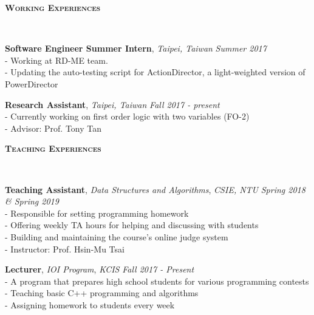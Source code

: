 \documentclass[10pt]{article}
\newenvironment{changemargin}[2]{%
  \begin{list}{}{%
    \setlength{\topsep}{0pt}%
    \setlength{\leftmargin}{#1}%
    \setlength{\rightmargin}{#2}%
    \setlength{\listparindent}{\parindent}%
    \setlength{\itemindent}{\parindent}%
    \setlength{\parsep}{\parskip}%
  }%
  \item[]}{\end{list}
}
\newcommand{\lineover}{
	\begin{changemargin}{-0.05in}{-0.05in}
		\vspace*{-8pt}
		\hrulefill \\
		\vspace*{-2pt}
	\end{changemargin}
}
\newcommand{\header}[1]{
	\begin{changemargin}{-0.5in}{-0.5in}
		\large{\bf \scshape{#1}}\\
  	\lineover
	\end{changemargin}
}
\newenvironment{body} {
	\vspace*{-16pt}
	\begin{changemargin}{-0.25in}{-0.5in}
  }	
	{\end{changemargin}
}
\begin{document}
\smallskip

\header{Working Experiences}

\begin{body}
	\vspace{14pt}

	\textbf {Software Engineer Summer Intern}, \emph{Taipei, Taiwan} \hfill \emph{Summer 2017}\\
	\hspace{12pt} - Working at RD-ME team.\\
	\hspace{12pt} - Updating the auto-testing script for ActionDirector, a light-weighted version of PowerDirector
	\smallskip
	
	\textbf {Research Assistant}, \emph{Taipei, Taiwan} \hfill \emph{Fall 2017 - present}\\
	\hspace{12pt} - Currently working on first order logic with two variables (FO-2)\\
	\hspace{12pt} - Advisor: Prof. Tony Tan
	\smallskip
	
\end{body}

\smallskip

\header{Teaching Experiences}

\begin{body}
	\vspace{14pt}

	\textbf {Teaching Assistant}, {\textit{Data Structures and Algorithms}}, \emph{CSIE, NTU} \hfill \emph{Spring 2018 \& Spring 2019}\\
	\hspace{12pt} - Responsible for setting programming homework\\
	\hspace{12pt} - Offering weekly TA hours for helping and discussing with students\\
	\hspace{12pt} - Building and maintaining the course's online judge system\\
	\hspace{12pt} - Instructor: Prof. Hsin-Mu Tsai\\
	\smallskip
	
	\textbf {Lecturer}, {\textit{IOI Program}}, \emph{KCIS} \hfill \emph{Fall 2017 - Present}\\
	\hspace{12pt} - A program that prepares high school students for various programming contests\\
	\hspace{12pt} - Teaching basic C++ programming and algorithms\\
	\hspace{12pt} - Assigning homework to students every week\\
	\smallskip

\end{body}
\end{document}
